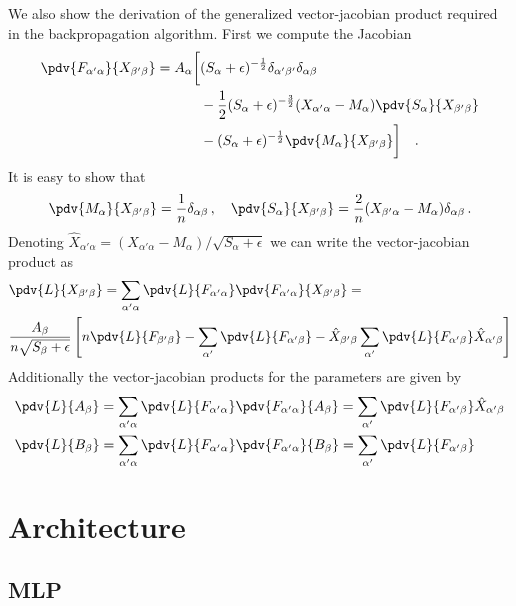 \documentclass[a5paper]{article}
\newcommand{\onehalf}{\frac{1}{2}}
\newcommand{\threehalves}{\frac{3}{2}}
\begin{document}
We also show the derivation of the generalized vector-jacobian product required in the
backpropagation algorithm. First we compute the Jacobian
\[
\begin{split}
   \pdv{F_{\alpha'\alpha}}{X_{\beta'\beta}} = A_\alpha \bigg[ 
                                            & (S_\alpha + \epsilon)^{-\onehalf} \delta_{\alpha'\beta'} \delta_{\alpha\beta} \\
                                            & - \frac{1}{2}(S_\alpha + \epsilon)^{-\threehalves} (X_{\alpha'\alpha} - M_\alpha) \pdv{S_\alpha}{X_{\beta'\beta}} \\
                                            & - (S_\alpha + \epsilon)^{-\onehalf} \pdv{M_\alpha}{X_{\beta'\beta}}
                                            \bigg]\quad.
\end{split}
\]
It is easy to show that 
\[
   \pdv{M_\alpha}{X_{\beta'\beta}} = \frac{1}{n} \delta_{\alpha\beta}\,,\quad \pdv{S_\alpha}{X_{\beta'\beta}} = \frac{2}{n}(X_{\beta'\alpha} - M_\alpha) \delta_{\alpha\beta} \,.
\]
Denoting \(\hat{X}_{\alpha'\alpha} = (X_{\alpha'\alpha} - M_\alpha) / \sqrt{S_\alpha + \epsilon}\)
we can write the vector-jacobian product as
\[
\begin{split}
   &\pdv{L}{X_{\beta'\beta}} = \sum_{\alpha'\alpha} \pdv{L}{F_{\alpha'\alpha}} \pdv{F_{\alpha'\alpha}}{X_{\beta'\beta}} =\\
   &\frac{A_\beta}{n\sqrt{S_\beta + \epsilon}} \left[ n \pdv{L}{F_{\beta'\beta}} - \sum_{\alpha'} \pdv{L}{F_{\alpha'\beta}} - \hat{X}_{\beta'\beta} \sum_{\alpha'} \pdv{L}{F_{\alpha'\beta}} \hat{X}_{\alpha'\beta} \right]
\end{split}
\]
Additionally the vector-jacobian products for the parameters are given by
\[
\begin{split}
   &\pdv{L}{A_\beta} = \sum_{\alpha'\alpha} \pdv{L}{F_{\alpha'\alpha}} \pdv{F_{\alpha'\alpha}}{A_\beta} = \sum_{\alpha'} \pdv{L}{F_{\alpha'\beta}} \hat{X}_{\alpha'\beta}\\
   &\pdv{L}{B_\beta} =  \sum_{\alpha'\alpha} \pdv{L}{F_{\alpha'\alpha}} \pdv{F_{\alpha'\alpha}}{B_\beta} = \sum_{\alpha'} \pdv{L}{F_{\alpha'\beta}}
\end{split}
\]


\section{Architecture}

\subsection{MLP}
\end{document}
